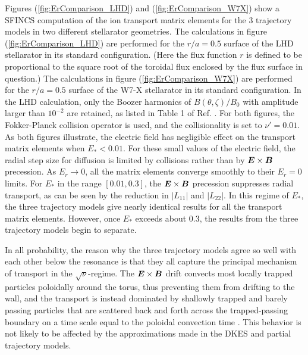 \documentclass[12pt,superscriptaddress]{revtex4}
\newcommand{\vect}[1]{\mbox{\boldmath $#1$}}
\begin{document}
Figures (\ref{fig:ErComparison_LHD}) and (\ref{fig:ErComparison_W7X}) show a SFINCS computation of
the ion transport matrix elements for the 3 trajectory models
in two different stellarator geometries.
The calculations in figure (\ref{fig:ErComparison_LHD}) are performed for the $r/a=0.5$ surface of
the LHD stellarator \cite{LHD} in its standard configuration. (Here the flux function $r$ is defined to be proportional to the square root of the toroidal flux enclosed by the flux surface in question.)
The calculations in figure (\ref{fig:ErComparison_W7X}) are performed for the $r/a=0.5$ surface of
the W7-X stellarator \cite{W7X1,W7X2} in its standard configuration.
In the LHD calculation, only the Boozer harmonics of $B(\theta,\zeta)/B_0$ with amplitude larger than $10^{-2}$
are retained, as listed in Table 1 of Ref. \cite{BeidlerBigBenchmarking}.
For both figures, the Fokker-Planck collision operator is used, and the collisionality
is set to $\nu'=0.01$.
As both figures illustrate, the electric field has negligible
effect on the transport matrix elements when $E_* < 0.01$.
For these small values of the electric field, the radial step size for diffusion is 
limited by collisions rather than by $\vect{E}\times\vect{B}$ precession.
As $E_r \to 0$, all the matrix elements converge smoothly to their $E_r=0$ limits.
For $E_*$ in the range $[0.01, 0.3]$,
the $\vect{E}\times\vect{B}$ precession suppresses radial transport,
as can be seen by the reduction in $|L_{11}|$ and $|L_{22}|$. In this regime of $E_*$, the three trajectory models give nearly
identical results for all the transport matrix elements.
However, once $E_*$ exceeds about 0.3, the results from the three trajectory models
begin to separate. 

In all probability, the reason why the three trajectory models agree
so well with each other below the resonance is that they all capture
the principal mechanism of transport in the $\sqrt{\nu}$-regime. The
$\vect{E}\times\vect{B}$ drift convects most locally trapped particles
poloidally around the torus, thus preventing them from drifting to the
wall, and the transport is instead dominated by shallowly trapped and
barely passing particles that are scattered back and forth across the
trapped-passing boundary on a time scale equal to the poloidal
convection time \cite{HoKulsrud}. This behavior is not likely to be
affected by the approximations 
made in the DKES and partial trajectory models.
\end{document}
